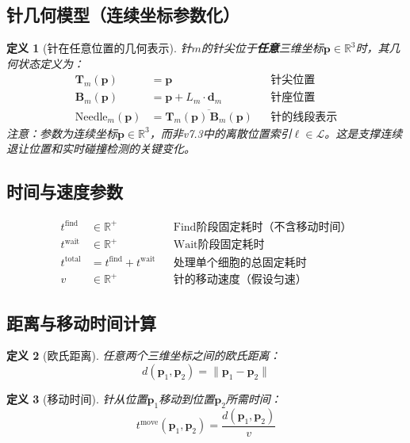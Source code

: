 \documentclass[11pt,a4paper]{article}
\newtheorem{definition}{定义}[section]
\begin{document}
\subsection{针几何模型（连续坐标参数化）}

\begin{definition}[针在任意位置的几何表示]
针$m$的针尖位于\textbf{任意}三维坐标$\mathbf{p} \in \mathbb{R}^3$时，其几何状态定义为：
\begin{align}
    \mathbf{T}_m(\mathbf{p}) &= \mathbf{p} && \text{针尖位置} \\
    \mathbf{B}_m(\mathbf{p}) &= \mathbf{p} + L_m \cdot \mathbf{d}_m && \text{针座位置} \\
    \text{Needle}_m(\mathbf{p}) &= \overline{\mathbf{T}_m(\mathbf{p})\,\mathbf{B}_m(\mathbf{p})} && \text{针的线段表示}
\end{align}
注意：参数为连续坐标$\mathbf{p} \in \mathbb{R}^3$，而非v7.3中的离散位置索引$\ell \in \mathcal{L}$。这是支撑连续退让位置和实时碰撞检测的关键变化。
\end{definition}

\subsection{时间与速度参数}

\begin{align}
    t^{\text{find}} &\in \mathbb{R}^+ && \text{Find阶段固定耗时（不含移动时间）} \\
    t^{\text{wait}} &\in \mathbb{R}^+ && \text{Wait阶段固定耗时} \\
    t^{\text{total}} &= t^{\text{find}} + t^{\text{wait}} && \text{处理单个细胞的总固定耗时} \\
    v &\in \mathbb{R}^+ && \text{针的移动速度（假设匀速）}
\end{align}

\subsection{距离与移动时间计算}

\begin{definition}[欧氏距离]
任意两个三维坐标之间的欧氏距离：
\begin{equation}
    d(\mathbf{p}_1, \mathbf{p}_2) = \|\mathbf{p}_1 - \mathbf{p}_2\|
\end{equation}
\end{definition}

\begin{definition}[移动时间]
针从位置$\mathbf{p}_1$移动到位置$\mathbf{p}_2$所需时间：
\begin{equation}
    t^{\text{move}}(\mathbf{p}_1, \mathbf{p}_2) = \frac{d(\mathbf{p}_1, \mathbf{p}_2)}{v}
\end{equation}
\end{definition}
\end{document}
